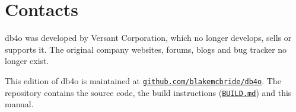 
\chapter{Contacts}
\label{ref:contacts}

db4o was developed by Versant Corporation, which no longer develops, sells or supports it. The original company websites, forums, blogs and bug tracker no longer exist.

This edition of db4o is maintained at \href{https://github.com/blakemcbride/db4o}{\nolinkurl{github.com/blakemcbride/db4o}}. The repository contains the source code, the build instructions (\href{https://github.com/blakemcbride/db4o/blob/master/BUILD.md}{\nolinkurl{BUILD.md}}) and this manual.
